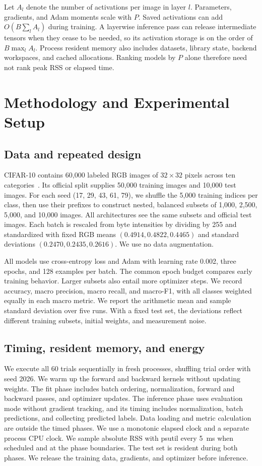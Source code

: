 \documentclass[conference]{IEEEtran}
\begin{document}
Let $A_l$ denote the number of activations per image in layer $l$. Parameters, gradients, and Adam moments scale with $P$. Saved activations can add $O(B\sum_l A_l)$ during training. A layerwise inference pass can release intermediate tensors when they cease to be needed, so its activation storage is on the order of $B\max_l A_l$. Process resident memory also includes datasets, library state, backend workspaces, and cached allocations. Ranking models by $P$ alone therefore need not rank peak RSS or elapsed time.

\section{Methodology and Experimental Setup}
\subsection{Data and repeated design}
CIFAR-10 contains 60,000 labeled RGB images of $32\times32$ pixels across ten categories~\cite{cifar}. Its official split supplies 50,000 training images and 10,000 test images. For each seed (17, 29, 43, 61, 79), we shuffle the 5,000 training indices per class, then use their prefixes to construct nested, balanced subsets of 1,000, 2,500, 5,000, and 10,000 images. All architectures see the same subsets and official test images. Each batch is rescaled from byte intensities by dividing by 255 and standardized with fixed RGB means $(0.4914,0.4822,0.4465)$ and standard deviations $(0.2470,0.2435,0.2616)$. We use no data augmentation.

All models use cross-entropy loss and Adam with learning rate 0.002, three epochs, and 128 examples per batch. The common epoch budget compares early training behavior. Larger subsets also entail more optimizer steps. We record accuracy, macro precision, macro recall, and macro-F1, with all classes weighted equally in each macro metric. We report the arithmetic mean and sample standard deviation over five runs. With a fixed test set, the deviations reflect different training subsets, initial weights, and measurement noise.

\subsection{Timing, resident memory, and energy}
We execute all 60 trials sequentially in fresh processes, shuffling trial order with seed 2026. We warm up the forward and backward kernels without updating weights. The fit phase includes batch ordering, normalization, forward and backward passes, and optimizer updates. The inference phase uses evaluation mode without gradient tracking, and its timing includes normalization, batch predictions, and collecting predicted labels. Data loading and metric calculation are outside the timed phases. We use a monotonic elapsed clock and a separate process CPU clock. We sample absolute RSS with psutil every 5~ms when scheduled and at the phase boundaries. The test set is resident during both phases. We release the training data, gradients, and optimizer before inference.
\end{document}
